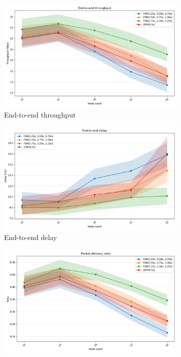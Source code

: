 \documentclass{winslabreport}
\begin{document}
\begin{figure}
    \centering
    \begin{subfigure}[b]{0.45\textwidth}
        \includegraphics[width=\textwidth]{../figures/nodeCount/end-to-end_throughput.png}
        \caption{End-to-end throughput}
        \label{fig:tput_node}
    \end{subfigure}
    \hfill
    \begin{subfigure}[b]{0.45\textwidth}
        \includegraphics[width=\textwidth]{../figures/nodeCount/end-to-end_delay.png}
        \caption{End-to-end delay}
        \label{fig:delay_node}
    \end{subfigure}
    \begin{subfigure}[b]{0.45\textwidth}
        \includegraphics[width=\textwidth]{../figures/nodeCount/packet_delivery_ratio.png}

\end{subfigure}
\end{figure}
\end{document}

